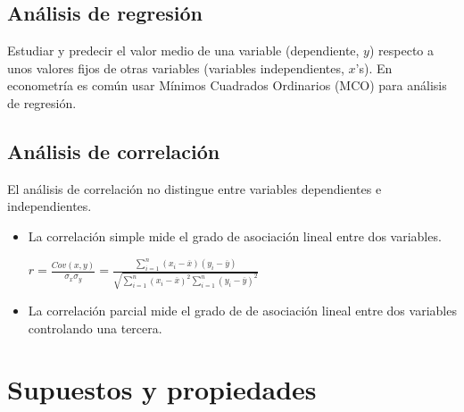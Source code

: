 \documentclass[10pt, a4paper, landscape]{extarticle}
\begin{document}
\begin{multicols}{3}
	\subsection*{Análisis de regresión}
		Estudiar y predecir el valor medio de una variable (dependiente, $y$) respecto a unos valores fijos de otras variables (variables independientes, $x$'s). En econometría es común usar Mínimos Cuadrados Ordinarios (MCO) para análisis de regresión.
	\subsection*{Análisis de correlación}
		El análisis de correlación no distingue entre variables dependientes e independientes.
		\begin{itemize}[leftmargin=*]
			\item La correlación simple mide el grado de asociación lineal entre dos variables.
			\begin{center}
				$r = \frac{Cov(x,y)}{\sigma_x \sigma_y} = \frac{\sum_{i=1}^n (x_i - \overline{x})(y_i - \overline{y})}{\sqrt{\sum_{i=1}^n (x_i - \overline{x})^2 \sum_{i=1}^n (y_i - \overline{y})^2}}$
			\end{center}
			\item La correlación parcial mide el grado de de asociación lineal entre dos variables controlando una tercera.
		\end{itemize}

\columnbreak

\section*{Supuestos y propiedades}

\end{multicols}
\end{document}
